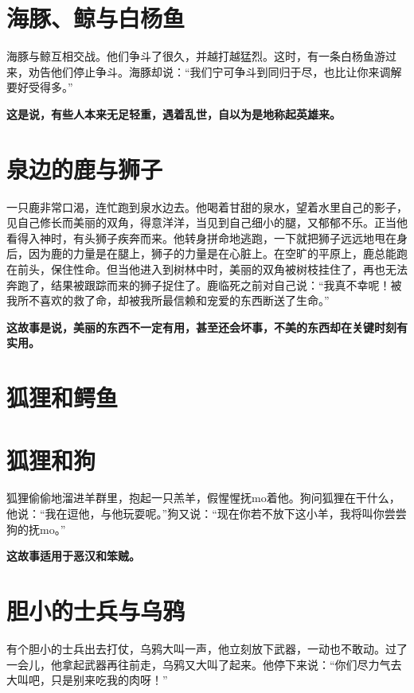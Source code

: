 \section{海豚、鲸与白杨鱼}

海豚与鲸互相交战。他们争斗了很久，并越打越猛烈。这时，有一条白杨鱼游过来，劝告他们停止争斗。海豚却说：“我们宁可争斗到同归于尽，也比让你来调解要好受得多。”

{\bfseries \color{red}这是说，有些人本来无足轻重，遇着乱世，自以为是地称起英雄来。}

\section{泉边的鹿与狮子}

一只鹿非常口渴，连忙跑到泉水边去。他喝着甘甜的泉水，望着水里自己的影子，见自己修长而美丽的双角，得意洋洋，当见到自己细小的腿，又郁郁不乐。正当他看得入神时，有头狮子疾奔而来。他转身拼命地逃跑，一下就把狮子远远地甩在身后，因为鹿的力量是在腿上，狮子的力量是在心脏上。在空旷的平原上，鹿总能跑在前头，保住性命。但当他进入到树林中时，美丽的双角被树枝挂住了，再也无法奔跑了，结果被跟踪而来的狮子捉住了。鹿临死之前对自己说：“我真不幸呢！被我所不喜欢的救了命，却被我所最信赖和宠爱的东西断送了生命。”

{\bfseries \color{red}这故事是说，美丽的东西不一定有用，甚至还会坏事，不美的东西却在关键时刻有实用。}

\section{狐狸和鳄鱼}



{\bfseries \color{red}}

\section{狐狸和狗}

狐狸偷偷地溜进羊群里，抱起一只羔羊，假惺惺抚mo着他。狗问狐狸在干什么，他说：“我在逗他，与他玩耍呢。”狗又说：“现在你若不放下这小羊，我将叫你尝尝狗的抚mo。”

{\bfseries \color{red}这故事适用于恶汉和笨贼。}

\section{胆小的士兵与乌鸦}

有个胆小的士兵出去打仗，乌鸦大叫一声，他立刻放下武器，一动也不敢动。过了一会儿，他拿起武器再往前走，乌鸦又大叫了起来。他停下来说：“你们尽力气去大叫吧，只是别来吃我的肉呀！”

